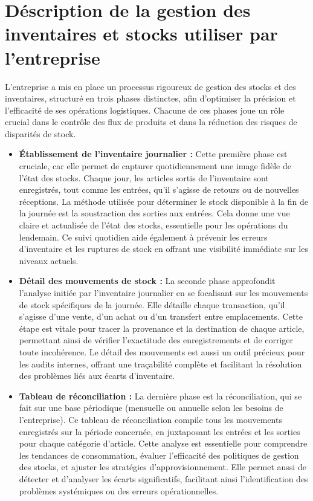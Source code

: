 \documentclass[a4paper, oneside, 12pt, final]{extreport}
\begin{document}
\section{Déscription de la gestion des inventaires et stocks utiliser par l'entreprise}
L'entreprise a mis en place un processus rigoureux de gestion des stocks et des inventaires, structuré en trois phases distinctes, afin d'optimiser la précision et l'efficacité de ses opérations logistiques. Chacune de ces phases joue un rôle crucial dans le contrôle des flux de produits et dans la réduction des risques de disparités de stock.
\begin{itemize}


\item \textbf{Établissement de l'inventaire journalier :} Cette première phase est cruciale, car elle permet de capturer quotidiennement une image fidèle de l'état des stocks. Chaque jour, les articles sortis de l'inventaire sont enregistrés, tout comme les entrées, qu'il s'agisse de retours ou de nouvelles réceptions. La méthode utilisée pour déterminer le stock disponible à la fin de la journée est la soustraction des sorties aux entrées. Cela donne une vue claire et actualisée de l'état des stocks, essentielle pour les opérations du lendemain. Ce suivi quotidien aide également à prévenir les erreurs d’inventaire et les ruptures de stock en offrant une visibilité immédiate sur les niveaux actuels.

\item \textbf{Détail des mouvements de stock :} La seconde phase approfondit l'analyse initiée par l'inventaire journalier en se focalisant sur les mouvements de stock spécifiques de la journée. Elle détaille chaque transaction, qu'il s'agisse d'une vente, d'un achat ou d'un transfert entre emplacements. Cette étape est vitale pour tracer la provenance et la destination de chaque article, permettant ainsi de vérifier l'exactitude des enregistrements et de corriger toute incohérence. Le détail des mouvements est aussi un outil précieux pour les audits internes, offrant une traçabilité complète et facilitant la résolution des problèmes liés aux écarts d'inventaire.

\item \textbf{Tableau de réconciliation :} La dernière phase est la réconciliation, qui se fait sur une base périodique (mensuelle ou annuelle selon les besoins de l'entreprise). Ce tableau de réconciliation compile tous les mouvements enregistrés sur la période concernée, en juxtaposant les entrées et les sorties pour chaque catégorie d'article. Cette analyse est essentielle pour comprendre les tendances de consommation, évaluer l'efficacité des politiques de gestion des stocks, et ajuster les stratégies d'approvisionnement. Elle permet aussi de détecter et d'analyser les écarts significatifs, facilitant ainsi l'identification des problèmes systémiques ou des erreurs opérationnelles.
\end{itemize}
\end{document}
